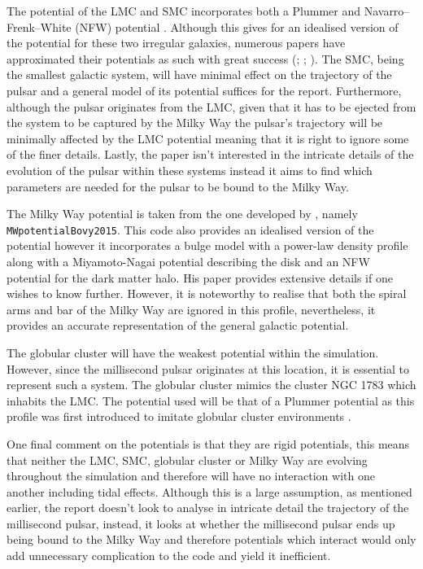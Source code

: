 The potential of the LMC and SMC incorporates both a Plummer and Navarro–Frenk–White (NFW) potential \citep{Navarro1997}. Although this gives for an idealised version of the potential for these two irregular galaxies, numerous papers have approximated their potentials as such with great success (\cite{Besla}; \cite{Yoshizawa}; \cite{Bekki}). The SMC, being the smallest galactic system, will have minimal effect on the trajectory of the pulsar and a general model of its potential suffices for the report. Furthermore, although the pulsar originates from the LMC, given that it has to be ejected from the system to be captured by the Milky Way the pulsar's trajectory will be minimally affected by the LMC potential meaning that it is right to ignore some of the finer details. Lastly, the paper isn't interested in the intricate details of the evolution of the pulsar within these systems instead it aims to find which parameters are needed for the pulsar to be bound to the Milky Way.

The Milky Way potential is taken from the one developed by \cite{Bovy2015}, namely \texttt{MWpotentialBovy2015}. This code also provides an idealised version of the potential however it incorporates a bulge model with a power-law density profile along with a Miyamoto-Nagai potential describing the disk and an NFW potential for the dark matter halo. His paper provides extensive details if one wishes to know further. However, it is noteworthy to realise that both the spiral arms and bar of the Milky Way are ignored in this profile, nevertheless, it provides an accurate representation of the general galactic potential.

The globular cluster will have the weakest potential within the simulation. However, since the millisecond pulsar originates at this location, it is essential to represent such a system. The globular cluster mimics the cluster NGC 1783 which inhabits the LMC. The potential used will be that of a Plummer potential as this profile was first introduced to imitate globular cluster environments \citep{Plummer}.

One final comment on the potentials is that they are rigid potentials, this means that neither the LMC, SMC, globular cluster or Milky Way are evolving throughout the simulation and therefore will have no interaction with one another including tidal effects. Although this is a large assumption, as mentioned earlier, the report doesn't look to analyse in intricate detail the trajectory of the millisecond pulsar, instead, it looks at whether the millisecond pulsar ends up being bound to the Milky Way and therefore potentials which interact would only add unnecessary complication to the code and yield it inefficient.

